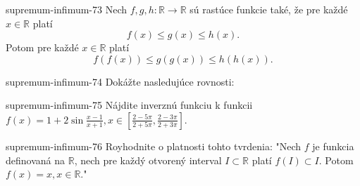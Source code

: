 \begin{defproblem}{supremum-infimum-73}
Nech $f,g,h:\mathbb{R}\rightarrow\mathbb{R}$ sú rastúce funkcie také, že pre každé $x\in\mathbb{R}$ platí $$f(x)\leq g(x)\leq h(x).$$
Potom pre každé $x\in\mathbb{R}$ platí $$f(f(x))\leq g(g(x))\leq h(h(x)).$$
\end{defproblem}

\begin{defproblem}{supremum-infimum-74}
Dokážte nasledujúce rovnosti:
\end{defproblem}

\begin{defproblem}{supremum-infimum-75}
Nájdite inverznú funkciu k funkcii $f(x)=1+2\sin\frac{x-1}{x+1},x\in[\frac{2-5\pi}{2+5\pi},\frac{2-3\pi}{2+3\pi}]$.
\end{defproblem}

\begin{defproblem}{supremum-infimum-76}
Royhodnite o platnosti tohto tvrdenia: "Nech $f$ je funkcia definovaná na $\mathbb{R}$, nech pre každý otvorený interval $I\subset\mathbb{R}$ platí $f(I)\subset I$. Potom $f(x)=x,x\in\mathbb{R}$."
\end{defproblem}